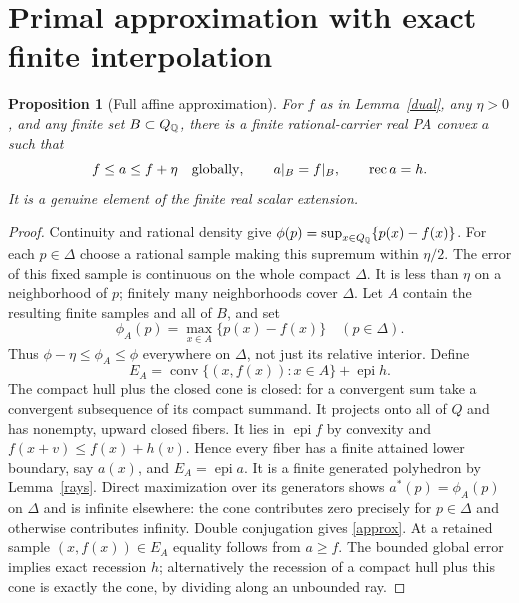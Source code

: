 \documentclass[11pt]{article}
\newtheorem{proposition}[theorem]{Proposition}
\theoremstyle{definition}\newtheorem{definition}[theorem]{Definition}
\theoremstyle{remark}\newtheorem{remark}[theorem]{Remark}
\newcommand{\epi}{\operatorname{epi}}\newcommand{\conv}{\operatorname{conv}}\newcommand{\cone}{\operatorname{cone}}
\newcommand{\rec}{\operatorname{rec}}\newcommand{\dom}{\operatorname{dom}}
\begin{document}
\section{Primal approximation with exact finite interpolation}
\begin{proposition}[Full affine approximation]\label{affine}
For $f$ as in Lemma~\ref{dual}, any $\eta>0$, and any finite set $B\subset Q_\mathbb Q$, there is a finite rational-carrier real PA convex $a$ such that
\begin{equation}\label{approx}
f\leq a\leq f+\eta\quad\hbox{globally},\qquad a|_B=f|_B,\qquad \rec a=h.
\end{equation}
It is a genuine element of the finite real scalar extension.
\end{proposition}
\begin{proof}
Continuity and rational density give
$\phi(p)=\sup_{x\in Q_\mathbb Q}\{p(x)-f(x)\}$.
For each $p\in\Delta$ choose a rational sample making this supremum within $\eta/2$. The error of this fixed sample is continuous on the whole compact $\Delta$. It is less than $\eta$ on a neighborhood of $p$; finitely many neighborhoods cover $\Delta$. Let $A$ contain the resulting finite samples and all of $B$, and set
\[
\phi_A(p)=\max_{x\in A}\{p(x)-f(x)\}\quad(p\in\Delta).
\]
Thus $\phi-\eta\leq\phi_A\leq\phi$ everywhere on $\Delta$, not just its relative interior. Define
\begin{equation}\label{primalepi}
E_A=\conv\{(x,f(x)):x\in A\}+\epi h.
\end{equation}
The compact hull plus the closed cone is closed: for a convergent sum take a convergent subsequence of its compact summand. It projects onto all of $Q$ and has nonempty, upward closed fibers. It lies in $\epi f$ by convexity and $f(x+v)\leq f(x)+h(v)$. Hence every fiber has a finite attained lower boundary, say $a(x)$, and $E_A=\epi a$. It is a finite generated polyhedron by Lemma~\ref{rays}. Direct maximization over its generators shows
$a^*(p)=\phi_A(p)$ on $\Delta$ and is infinite elsewhere: the cone contributes zero precisely for $p\in\Delta$ and otherwise contributes infinity. Double conjugation gives \eqref{approx}. At a retained sample $(x,f(x))\in E_A$ equality follows from $a\geq f$. The bounded global error implies exact recession $h$; alternatively the recession of a compact hull plus this cone is exactly the cone, by dividing along an unbounded ray.


\end{proof}
\end{document}
